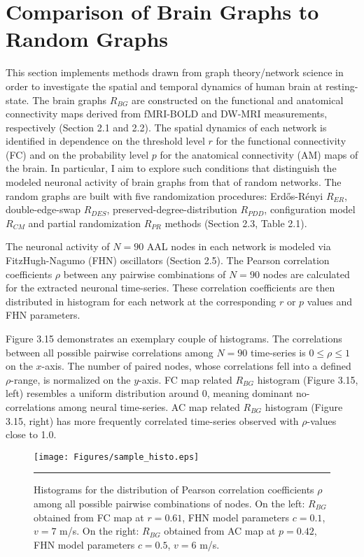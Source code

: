 \section{Comparison of Brain Graphs to Random Graphs}

This section implements methods drawn from graph theory/network science in order to investigate the spatial and temporal dynamics of human brain at resting-state. The brain graphs $R_{BG}$ are constructed on the functional and anatomical connectivity maps derived from fMRI-BOLD and DW-MRI measurements, respectively (Section 2.1 and 2.2). The spatial dynamics of each network is identified in dependence on the threshold level $r$ for the functional connectivity (FC) and on the probability level $p$ for the anatomical connectivity (AM) maps of the brain. In particular, I aim to explore such conditions that distinguish the modeled neuronal activity of brain graphs from that of random networks. The random graphs are built with five randomization procedures: Erd\H{o}s-R\'{e}nyi $R_{ER}$, double-edge-swap $R_{DES}$, preserved-degree-distribution $R_{PDD}$, configuration model $R_{CM}$ and partial randomization $R_{PR}$ methods (Section 2.3, Table 2.1).  

The neuronal activity of $N=90$ AAL nodes in each network is modeled via FitzHugh-Nagumo (FHN) oscillators \citep{VUK13, GHO08a} (Section 2.5). The Pearson correlation coefficients $\rho$ between any pairwise combinations of $N=90$ nodes are calculated for the extracted neuronal time-series. These correlation coefficients are then distributed in histogram for each network at the corresponding $r$ or $p$ values and FHN parameters.

Figure 3.15 demonstrates an exemplary couple of histograms. The correlations between all possible pairwise correlations among $N=90$ time-series is $ 0 \leq \rho \leq 1$ on the $x$-axis. The number of paired nodes, whose correlations fell into a defined $\rho$-range, is normalized on the $y$-axis. FC map related $R_{BG}$ histogram (Figure 3.15, left) resembles a uniform distribution around 0, meaning dominant no-correlations among neural time-series. AC map related $R_{BG}$  histogram (Figure 3.15, right) has more frequently correlated time-series observed with $\rho$-values close to 1.0.  


\begin{figure}[htbp]
 
  \centering
	 \texttt{[image: Figures/sample\_histo.eps]}
	 \rule{35em}{0.5pt}
  \caption[Sample Histogram for Brain Graph]{Histograms for the distribution of Pearson correlation coefficients $\rho$  among all possible pairwise combinations of nodes. On the left: $R_{BG}$ obtained from FC map at $r=0.61$, FHN model parameters $c=0.1$, $v=7$ m/s. On the right: $R_{BG}$ obtained from AC map at $p=0.42$, FHN model parameters $c=0.5$, $v=6$ m/s. } 
    \label{fig:Sample Histogram for Brain Graph}
 	
\end{figure}  


